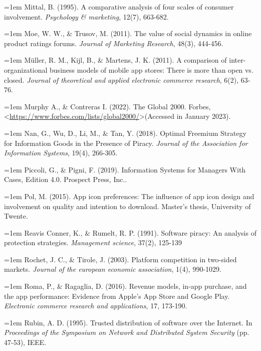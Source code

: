 \hangindent=1em
Mittal, B. (1995). A comparative analysis of four scales of consumer involvement. \textit{Psychology \& marketing}, 12(7), 663-682.

\hangindent=1em
Moe, W. W., \& Trusov, M. (2011). The value of social dynamics in online product ratings forums. \textit{Journal of Marketing Research}, 48(3), 444-456.

\hangindent=1em
Müller, R. M., Kijl, B., \& Martens, J. K. (2011). A comparison of inter-organizational business models of mobile app stores: There is more than open vs. closed. \textit{Journal of theoretical and applied electronic commerce research}, 6(2), 63-76.

\hangindent=1em
Murphy A., \& Contreras I. (2022). The Global 2000. Forbes, \textless \url{https://www.forbes.com/lists/global2000/}\textgreater (Accessed in January 2023).

\hangindent=1em
Nan, G., Wu, D., Li, M., \& Tan, Y. (2018). Optimal Freemium Strategy for Information Goods in the Presence of Piracy. \textit{Journal of the Association for Information Systems}, 19(4), 266-305.

\hangindent=1em
Piccoli, G., \& Pigni, F. (2019). Information Systems for Managers With Cases, Edition 4.0. Prospect Press, Inc..

\hangindent=1em
Pol, M. (2015). App icon preferences: The influence of app icon design and involvement on quality and intention to download. Master's thesis, University of Twente.

\hangindent=1em
Reavis Conner, K., \& Rumelt, R. P. (1991). Software piracy: An analysis of protection strategies. \textit{Management science}, 37(2), 125-139

\hangindent=1em
Rochet, J. C., \& Tirole, J. (2003). Platform competition in two-sided markets. \textit{Journal of the european economic association}, 1(4), 990-1029.

\hangindent=1em
Roma, P., \& Ragaglia, D. (2016). Revenue models, in-app purchase, and the app performance: Evidence from Apple’s App Store and Google Play. \textit{Electronic commerce research and applications}, 17, 173-190.

\hangindent=1em
Rubin, A. D. (1995). Trusted distribution of software over the Internet. In \textit{Proceedings of the Symposium on Network and Distributed System Security} (pp. 47-53), IEEE.


